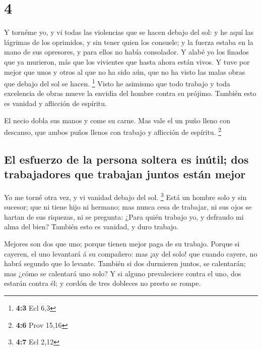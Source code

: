 \hypertarget{section-3}{%
\section{4}\label{section-3}}

 Y tornéme yo, y vi todas las violencias que se hacen
debajo del sol: y he aquí las lágrimas de los oprimidos, y sin tener
quien los consuele; y la fuerza estaba en la mano de sus opresores, y
para ellos no había consolador.  Y alabé yo los finados
que ya murieron, más que los vivientes que hasta ahora están vivos.
 Y tuve por mejor que unos y otros al que no ha sido aún,
que no ha visto las malas obras que debajo del sol se hacen. \footnote{\textbf{4:3}
  Ecl 6,3}  Visto he asimismo que todo trabajo y toda
excelencia de obras mueve la envidia del hombre contra su prójimo.
También esto es vanidad y aflicción de espíritu.

 El necio dobla sus manos y come su carne. 
Mas vale el un puño lleno con descanso, que ambos puños llenos con
trabajo y aflicción de espíritu. \footnote{\textbf{4:6} Prov 15,16}

\hypertarget{el-esfuerzo-de-la-persona-soltera-es-inuxfatil-dos-trabajadores-que-trabajan-juntos-estuxe1n-mejor}{%
\subsection{El esfuerzo de la persona soltera es inútil; dos
trabajadores que trabajan juntos están
mejor}\label{el-esfuerzo-de-la-persona-soltera-es-inuxfatil-dos-trabajadores-que-trabajan-juntos-estuxe1n-mejor}}

 Yo me torné otra vez, y vi vanidad debajo del sol.
\footnote{\textbf{4:7} Ecl 2,12}  Está un hombre solo y
sin sucesor; que ni tiene hijo ni hermano; mas nunca cesa de trabajar,
ni sus ojos se hartan de sus riquezas, ni se pregunta: ¿Para quién
trabajo yo, y defraudo mi alma del bien? También esto es vanidad, y duro
trabajo.

 Mejores son dos que uno; porque tienen mejor paga de su
trabajo.  Porque si cayeren, el uno levantará á su
compañero: mas ¡ay del solo! que cuando cayere, no habrá segundo que lo
levante.  También si dos durmieren juntos, se calentarán;
mas ¿cómo se calentará uno solo?  Y si alguno
prevaleciere contra el uno, dos estarán contra él; y cordón de tres
dobleces no presto se rompe.

